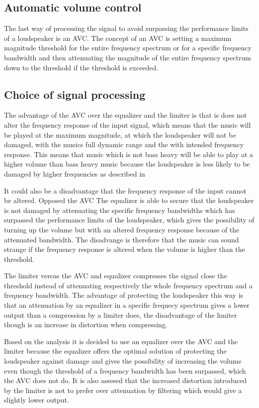 \subsection{Automatic volume control}
The last way of processing the signal to avoid surpassing the performance limits of a loudspeaker is an \gls{AVC}. The concept of an AVC is setting a maximum magnitude threshold for the entire frequency spectrum or for a specific frequency bandwidth and then attenuating the magnitude of the entire frequency spectrum down to the threshold if the threshold is exceeded.

\subsection{Choice of signal processing}
The advantage of the AVC over the equalizer and the limiter is that is does not alter the frequency response of the input signal, which means that the music will be played at the maximum magnitude, at which the loudspeaker will not be damaged, with the musics full dynamic range and the with intended frequency response. This means that music which is not bass heavy will be able to play at a higher volume than bass heavy music because the loudspeaker is less likely to be damaged by higher frequencies as described in 

It could also be a disadvantage that the frequency response of the input cannot be altered. Opposed the AVC The equalizer is able to secure that the loudspeaker is not damaged by attenuating the specific frequency bandwidths which has surpassed the performance limits of the loudspeaker, which gives the possibility of turning up the volume but with an altered frequency response because of the attenuated bandwidth. The disadvange is therefore that the music can sound strange if the frequency response is altered when the volume is higher than the threshold.

The limiter versus the AVC and equalizer compresses the signal close the threshold instead of attenuating respectively the whole frequency spectrum and a frequency bandwidth. The advantage of protecting the loudspeaker this way is that an attenuation by an equalizer in a specific frequecy spectrum gives a lower output than a compression by a limiter does, the disadvantage of the limiter though is an increase in distortion when compressing. 

Based on the analysis it is decided to use an equalizer over the AVC and the limiter because the equalizer offers the optimal solution of protecting the loudspeaker against damage and gives the possibility of increasing the volume even though the threshold of a frequency bandwidth has been surpassed, which the AVC does not do. It is also assesed that the increased distortion introduced by the limiter is not to prefer over attenuation by filtering which would give a slightly lower output.  


      